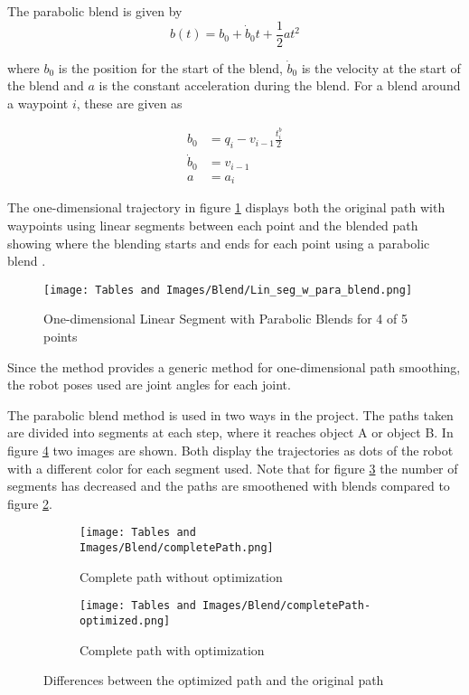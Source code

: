 \documentclass[Setup/main.tex]{subfiles}
\begin{document}
The parabolic blend is given by
\begin{equation}
    b(t) = b_0 + \Dot{b}_0t + \frac{1}{2}at^2
\end{equation}

where $b_0$ is the position for the start of the blend, $\Dot{b}_0$ is the velocity at the start of the blend and $a$ is the constant acceleration during the blend.
For a blend around a waypoint $i$, these are given as 

\begin{align}
    b_0 &= q_i - v_{i-1}\frac{t^b_i}{2} \\
    \Dot{b}_0 &= v_{i-1}\\
    a &= a_i
\end{align}

The one-dimensional trajectory in figure \ref{fig:Lin_seg_w_para_blend} displays both the original path with waypoints using linear segments between each point and the blended path showing where the blending starts and ends for each point using a parabolic blend \cite{path_to_traj}.

\begin{figure}[H]
    \centering
    \texttt{[image: Tables and Images/Blend/Lin\_seg\_w\_para\_blend.png]}
    \caption{One-dimensional Linear Segment with Parabolic Blends for 4 of 5 points}
    \label{fig:Lin_seg_w_para_blend}
\end{figure}

Since the method provides a generic method for one-dimensional path smoothing, the robot poses used are joint angles for each joint. 

The parabolic blend method is used in two ways in the project. The paths taken are divided into segments at each step, where it reaches object A or object B. In figure \ref{fig:completepath} two images are shown. Both display the trajectories as dots of the robot with a different color for each segment used. Note that for figure \ref{fig:completepath_op} the number of segments has decreased and the paths are smoothened with blends compared to figure \ref{fig:completepath_noop}.

\begin{figure}[H]
  \centering
  \begin{subfigure}[b]{0.8\linewidth}
    \texttt{[image: Tables and Images/Blend/completePath.png]}
    \caption{Complete path without optimization}
        \label{fig:completepath_noop}
  \end{subfigure}
  \par
  \begin{subfigure}[b]{0.8\linewidth}
    \texttt{[image: Tables and Images/Blend/completePath-optimized.png]}
    \caption{Complete path with optimization}
    \label{fig:completepath_op}
  \end{subfigure}
  \caption{Differences between the optimized path and the original path}
  \label{fig:completepath}
\end{figure}
\end{document}
